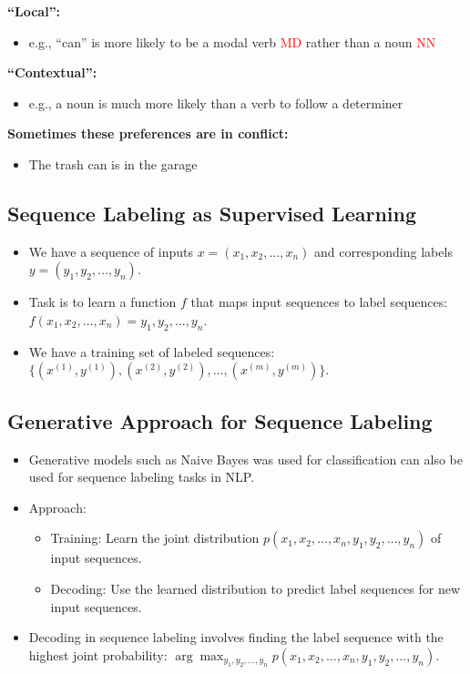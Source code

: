   \textbf{``Local'':}
  \begin{itemize}
    \item e.g., ``can'' is more likely to be a modal verb \textcolor{red}{MD} rather than a noun \textcolor{red}{NN}
  \end{itemize}

  \textbf{``Contextual'':}
  \begin{itemize}
    \item e.g., a noun is much more likely than a verb to follow a determiner
  \end{itemize}

  \textbf{Sometimes these preferences are in conflict:}
  \begin{itemize}
    \item The trash can is in the garage
  \end{itemize}


\subsection{Sequence Labeling as Supervised Learning}
    \begin{itemize}
      \item We have a sequence of inputs $x = (x_1, x_2, \ldots, x_n)$ and corresponding labels $y = (y_1, y_2, \ldots, y_n)$.
      \item Task is to learn a function $f$ that maps input sequences to label sequences: $f(x_1,x_2, \ldots, x_n) = y_1, y_2, \ldots, y_n$.
      \item We have a training set of labeled sequences: $\{(x^{(1)}, y^{(1)}), (x^{(2)}, y^{(2)}), \ldots, (x^{(m)}, y^{(m)})\}$.
    \end{itemize}
  


\subsection{Generative Approach for Sequence Labeling}
  \begin{itemize}
    \item Generative models such as Naive Bayes was used for classification can also be used for sequence labeling tasks in NLP.
    \item Approach:
    \begin{itemize}
      \item Training: Learn the joint distribution $p(x_1,x_2, \ldots, x_n,y_1, y_2, \ldots, y_n)$ of input sequences.
      \item Decoding: Use the learned distribution to predict label sequences for new input sequences.
    \end{itemize}
      \item Decoding in sequence labeling involves finding the label sequence with the highest joint probability: $\arg\max_{y_1, y_2, \ldots, y_n}p(x_1,x_2, \ldots, x_n,y_1, y_2, \ldots, y_n)$.
  \end{itemize}


